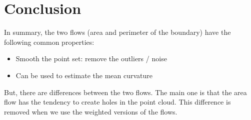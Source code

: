 \section{Conclusion}

In summary, the two flows (area and perimeter of the boundary) have the
following common properties:
\begin{itemize}
    \item Smooth the point set: remove the outliers / noise
    \item Can be used to estimate the mean curvature
\end{itemize}

But, there are differences between the two flows. The main one is that the area
flow has the tendency to create holes in the point cloud. This difference is
removed when we use the weighted versions of the flows.

